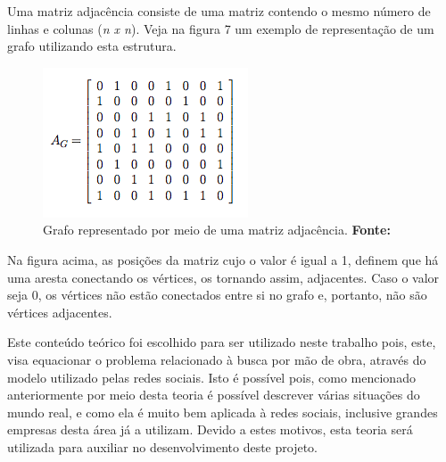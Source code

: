 Uma matriz adjacência consiste de uma matriz contendo o mesmo número de linhas e colunas (\textit{n x n}). Veja na figura 7 um exemplo de representação de um grafo utilizando esta estrutura.

\begin{figure}[h!]
	\centerline{\includegraphics[scale=0.7]{./imagens/matriz_adjacencia.png}}
	\caption[Grafo representado por meio de uma matriz adjacência]
	{Grafo representado por meio de uma matriz adjacência. \textbf{Fonte:} }
	\label{fig:exemplo1}
\end{figure}

Na figura acima, as posições da matriz cujo o valor é igual a 1, definem que há uma aresta conectando os vértices, os tornando assim, adjacentes. Caso o valor seja 0, os vértices não estão conectados entre si no grafo e, portanto, não são vértices adjacentes.

\par Este conteúdo teórico foi escolhido para ser utilizado neste trabalho pois,
este, visa equacionar o problema relacionado à busca por mão de obra, através do modelo utilizado pelas redes sociais. Isto é possível pois, como mencionado anteriormente por meio desta teoria é possível descrever várias situações do mundo real, e como ela é muito bem aplicada à redes sociais, inclusive grandes empresas desta área já a utilizam. Devido a estes motivos, esta teoria será  utilizada para auxiliar no desenvolvimento deste projeto.
